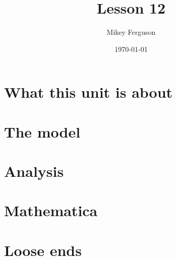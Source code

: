 \documentclass[11pt]{article}
\title{Lesson 12}
\author{Mikey Ferguson}
\date{\today}
\begin{document}
\maketitle
\tableofcontents
\bigskip

\section{What this unit is about}

\section{The model}

\section{Analysis}

\section{Mathematica}

\section{Loose ends}
\end{document}
